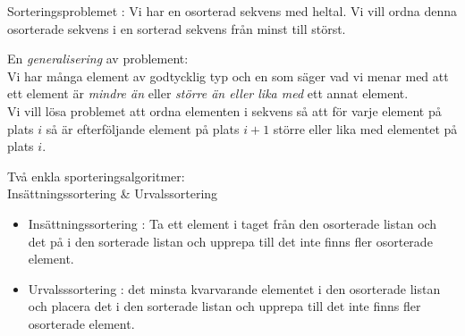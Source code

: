 



\begin{Slide}{Sorteringsproblemet}
: Vi har en osorterad sekvens med heltal. Vi vill ordna denna osorterade sekvens i en sorterad sekvens från minst till störst.
\pause

\vspace{2em}
En \emph{generalisering} av problement: \\ \vspace{1em} Vi har många element av godtycklig typ och en  som säger vad vi menar med att ett element är \emph{mindre än} eller \emph{större än eller lika med} ett annat element. \\ \vspace{1em}
Vi vill lösa problemet att ordna elementen i sekvens så att för varje element på plats $i$ så är efterföljande element på plats $i + 1$ större eller lika med elementet på plats $i$.

\end{Slide}

\begin{Slide}{Två enkla sporteringsalgoritmer: \\ Insättningssortering \& Urvalssortering}
\begin{itemize}
\item Insättningssortering : Ta ett element i taget från den osorterade listan och  det på  i den sorterade listan och upprepa till det inte finns fler osorterade element.
\pause
\item Urvalsssortering :  det minsta kvarvarande elementet i den osorterade listan och placera det  i den sorterade listan och upprepa till det inte finns fler osorterade element.
\end{itemize}
\end{Slide}



